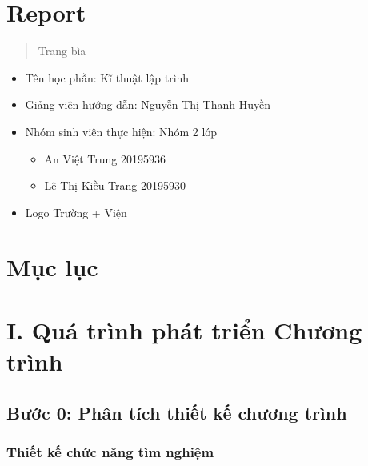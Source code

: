 \section{Report}\label{report}

\begin{quote}
Trang bìa
\end{quote}

\begin{itemize}
\itemsep1pt\parskip0pt
\item
  Tên học phần: Kĩ thuật lập trình
\item
  Giảng viên hướng dẫn: Nguyễn Thị Thanh Huyền
\item
  Nhóm sinh viên thực hiện: Nhóm 2 lớp

  \begin{itemize}
  \itemsep1pt\parskip0pt
  \item
    An Việt Trung 20195936
  \item
    Lê Thị Kiều Trang 20195930
  \end{itemize}
\item
  Logo Trường + Viện
\end{itemize}

\section{Mục lục}\label{mux1ee5c-lux1ee5c}

\section{I. Quá trình phát triển Chương
trình}\label{i.-quuxe1-truxecnh-phuxe1t-triux1ec3n-chux1b0ux1a1ng-truxecnh}

\subsection{Bước 0: Phân tích thiết kế chương
trình}\label{bux1b0ux1edbc-0-phuxe2n-tuxedch-thiux1ebft-kux1ebf-chux1b0ux1a1ng-truxecnh}

\subsubsection{Thiết kế chức năng tìm
nghiệm}\label{thiux1ebft-kux1ebf-chux1ee9c-nux103ng-tuxecm-nghiux1ec7m}

